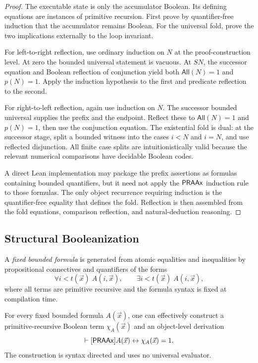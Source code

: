 \begin{proof}
The executable state is only the accumulator Boolean.  Its defining equations are instances of primitive recursion.  First prove by quantifier-free induction that the accumulator remains Boolean.  For the universal fold, prove the two implications externally to the loop invariant.

For left-to-right reflection, use ordinary induction on \(N\) at the proof-construction level.  At zero the bounded universal statement is vacuous.  At \(S N\), the successor equation and Boolean reflection of conjunction yield both \(\mathsf{All}(N)=1\) and \(p(N)=1\).  Apply the induction hypothesis to the first and predicate reflection to the second.

For right-to-left reflection, again use induction on \(N\).  The successor bounded universal supplies the prefix and the endpoint.  Reflect these to \(\mathsf{All}(N)=1\) and \(p(N)=1\), then use the conjunction equation.  The existential fold is dual: at the successor stage, split a bounded witness into the cases \(i<N\) and \(i=N\), and use reflected disjunction.  All finite case splits are intuitionistically valid because the relevant numerical comparisons have decidable Boolean codes.

A direct Lean implementation may package the prefix assertions as formulas containing bounded quantifiers, but it need not apply the \(\mathsf{PRAAx}\) induction rule to those formulas.  The only object recurrence requiring induction is the quantifier-free equality that defines the fold.  Reflection is then assembled from the fold equations, comparison reflection, and natural-deduction reasoning.
\end{proof}

\subsection{Structural Booleanization}

A \emph{fixed bounded formula} is generated from atomic equalities and inequalities by propositional connectives and quantifiers of the forms
\[
  \forall i<t(\vec x)\;A(i,\vec x),
  \qquad
  \exists i<t(\vec x)\;A(i,\vec x),
\]
where all terms are primitive recursive and the formula syntax is fixed at compilation time.

\begin{theorem}\label{thm:booleanization}
For every fixed bounded formula \(A(\vec x)\), one can effectively construct a primitive-recursive Boolean term \(\chi_A(\vec x)\) and an object-level derivation
\[
  \vdash[\mathsf{PRAAx}] A(\vec x)\leftrightarrow \chi_A(\vec x)=1.
\]
The construction is syntax directed and uses no universal evaluator.
\end{theorem}

